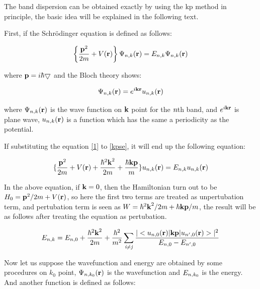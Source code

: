 \documentclass[a4paper, 12pt, titlepage,oneside,drop]{kthesis}
\begin{document}


The band dispersion can be obtained exactly by using the kp method in principle, the basic idea will be explained in the following text.

First, if the Schrödinger equation is defined as follows:

\begin{equation}\label{kpse}
\left\{ \frac {{\textbf p}^2} {2m} + V({\textbf r}) \right\} \wfbloch<n><k> = \ebloch<n><k> \wfbloch<n><k>
\end{equation}

where ${\textbf p} = i \hbar \bigtriangledown $ and the Bloch theory shows:

\begin{equation}\label{1}
 \wfbloch<n><k> = \expg<k> \ubloch<n><k>
\end{equation}

where $\wfbloch<n><k>$ is the wave function on ${\textbf k}$ point for the {$\textit n$}th band, and $\expg<k>$ is plane wave, $\ubloch<n><k>$ is a function which has the same a periodicity as the potential.

If substituting the equation \ref{1} to \ref{kpse}, it will end up the following equation:

\begin{equation}
 \{  \frac{{\textbf p}^2}{2m} + V({\textbf r }) + \frac{{\hbar^2 {\textbf k}^2}}{2m} + \frac{{\hbar \textbf {kp}}}{m} \} \ubloch<n><k>  =  \ebloch<n><k> \ubloch<n><k>
\end{equation}

In the above equation, if $\textbf k = 0$, then the Hamiltonian turn out to be $H_0 = {\textbf p}^2 / {2m} + V({\textbf r })$, so here the first two terms are treated as unpertubation term, and pertubation term is seen as
$W={{\hbar^2 {\textbf k}^2}}/{2m} + {{\hbar \textbf {kp}}}/{m}$, the result will be as follows after treating the equation as pertubation.

\begin{equation}
 \ebloch<n><k> = E_{n,0} + \frac{{\hbar^2 {\textbf k}^2}}{2m} + \frac{ \hbar^2}{m^2} \suminj<i><j> \frac{|<\ubloch<n><0>|{\textbf {kp}}|\ubloch<n'><0>>|^2}{E_{n,0} - E_{n',0}}
\end{equation}


Now let us suppose the wavefunction and energy are obtained by some procedures on $k_0$ point, $\wfbloch<n><k_0>$ is the wavefunction and $\ebloch<n><k_0>$ is the energy.
And another function is defined as follows:
\end{document}
